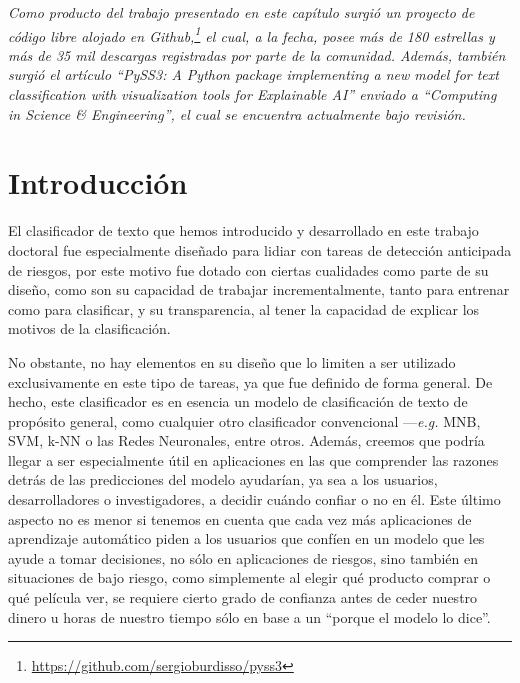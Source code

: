 \emph{Como producto del trabajo presentado en este capítulo surgió un proyecto de código libre alojado en Github,\footnote{\url{https://github.com/sergioburdisso/pyss3}} el cual, a la fecha, posee más de 180 estrellas y más de 35 mil descargas registradas por parte de la comunidad. Además, también surgió el artículo ``PySS3: A Python package implementing a new model for text classification with visualization tools for Explainable AI'' enviado a ``Computing in Science \& Engineering'', el cual se encuentra actualmente bajo revisión.}


\section{Introducción}

El clasificador de texto que hemos introducido y desarrollado en este trabajo doctoral fue especialmente diseñado para lidiar con tareas de detección anticipada de riesgos, por este motivo fue dotado con ciertas cualidades como parte de su diseño, como son su capacidad de trabajar incrementalmente, tanto para entrenar como para clasificar, y su transparencia, al tener la capacidad de explicar los motivos de la clasificación.

No obstante, no hay elementos en su diseño que lo limiten a ser utilizado exclusivamente en este tipo de tareas, ya que fue definido de forma general.
De hecho, este clasificador es en esencia un modelo de clasificación de texto de propósito general, como cualquier otro clasificador convencional ---\emph{e.g.} \ac{MNB}, \ac{SVM}, k-NN o las Redes Neuronales, entre otros.
Además, creemos que podría llegar a ser especialmente útil en aplicaciones en las que comprender las razones detrás de las predicciones del modelo ayudarían, ya sea a los usuarios, desarrolladores o investigadores, a decidir cuándo confiar o no en él.
Este último aspecto no es menor si tenemos en cuenta que cada vez más aplicaciones de aprendizaje automático piden a los usuarios que confíen en un modelo que les ayude a tomar decisiones, no sólo en aplicaciones de riesgos, sino también en situaciones de bajo riesgo, como simplemente al elegir qué producto comprar o qué película ver, se requiere cierto grado de confianza antes de ceder nuestro dinero u horas de nuestro tiempo sólo en base a un ``porque el modelo lo dice''.

